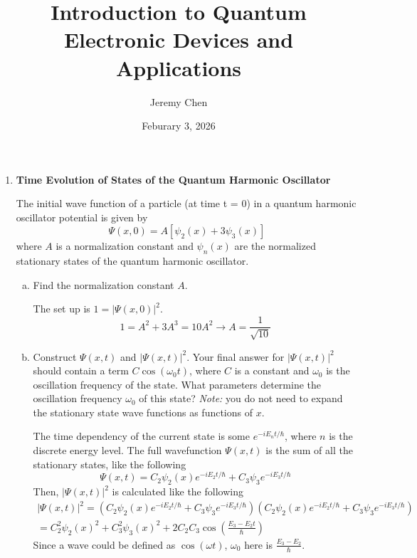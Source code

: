 \documentclass[10pt,letterpaper]{article}
\title{Introduction to Quantum Electronic Devices and Applications}
\author{Jeremy Chen}
\date{Feburary 3, 2026}
\begin{document}
	\maketitle

\begin{enumerate}

\item \textbf{Time Evolution of States of the Quantum Harmonic Oscillator}

The initial wave function of a particle (at time t = 0) in a quantum harmonic oscillator potential is given by 
$$\Psi(x, 0) = A[\psi_{2}(x) + 3\psi_{3}(x)]$$
where $A$ is a normalization constant and $\psi_{n}(x)$ are the normalized stationary states of the quantum harmonic oscillator. 

\begin{enumerate}[a)]
	
\item Find the normalization constant $A$. 
	
\color{violet}
The set up is $1 = |\Psi(x, 0)|^{2}$. 
$$1 = A^{2} + 3A^{3} = 10A^{2} \longrightarrow A = \frac{1}{\sqrt{10}}$$
\color{black}
	
\item Construct $\Psi(x, t)$ and $|\Psi(x, t)|^{2}$. Your final answer for $|\Psi(x, t)|^{2}$ should contain a term $C\cos(\omega_{0}t)$, where $C$ is a constant and $\omega_{0}$ is the oscillation frequency of the state. What parameters determine the oscillation frequency $\omega_{0}$ of this state? \textit{Note:} you do not need to expand the stationary state wave functions as functions of $x$.

\color{violet}
The time dependency of the current state is some $e^{-iE_{n}t/\hbar}$, where $n$ is the discrete energy level. The full wavefunction $\Psi(x, t)$ is the sum of all the stationary states, like the following
$$\Psi(x, t) = C_{2}\psi_{2}(x)e^{-iE_{2}t/\hbar} + C_{3}\psi_{3}e^{-iE_{3}t/\hbar}$$
Then, $|\Psi(x, t)|^{2}$ is calculated like the following
\begin{gather*}
|\Psi(x, t)|^{2} = \left(C_{2}\psi_{2}(x)e^{-iE_{2}t/\hbar} + C_{3}\psi_{3}e^{-iE_{3}t/\hbar} \right)\left(C_{2}\psi_{2}(x)e^{-iE_{2}t/\hbar} + C_{3}\psi_{3}e^{-iE_{3}t/\hbar} \right) \\
= C_{2}^{2}\psi_{2}(x)^{2} + C_{3}^{2}\psi_{3}(x)^{2} + 2C_{2}C_{3}\cos\left( \frac{E_{3} - E_{2}t}{\hbar} \right)
\end{gather*}
Since a wave could be defined as $\cos(\omega t)$, $\omega_{0}$ here is $\frac{E_{3} - E_{2}}{\hbar}$. 
\color{black}


\end{enumerate}
\end{enumerate}
\end{document}
